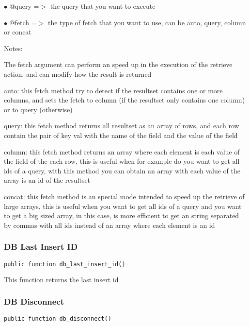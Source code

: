\documentclass[a4paper]{article}
\begin{document}
\begin{compactitem}
\item[\color{myblue}$\bullet$] @query =$>$ the query that you want to execute
\item[\color{myblue}$\bullet$] @fetch =$>$ the type of fetch that you want to use, can be auto, query, column or concat
\end{compactitem}

Notes:

The fetch argument can perform an speed up in the execution of the retrieve action, and
can modify how the result is returned

auto: this fetch method try to detect if the resultset contains one or more columns, and
sets the fetch to column (if the resultset only contains one column) or to query (otherwise)

query: this fetch method returns all resultset as an array of rows, and each row contain the
pair of key val with the name of the field and the value of the field

column: this fetch method returns an array where each element is each value of the field of
the each row, this is useful when for example do you want to get all ids of a query, with
this method you can obtain an array with each value of the array is an id of the resultset

concat: this fetch method is an special mode intended to speed up the retrieve of large
arrays, this is useful when you want to get all ids of a query and you want to get a big
sized array, in this case, is more efficient to get an string separated by commas with all
ids instead of an array where each element is an id

\hypertarget{toc361}{}
\subsubsection{DB Last Insert ID}

\begin{lstlisting}
public function db_last_insert_id()
\end{lstlisting}

This function returns the last insert id

\hypertarget{toc362}{}
\subsubsection{DB Disconnect}

\begin{lstlisting}
public function db_disconnect()
\end{lstlisting}
\end{document}
